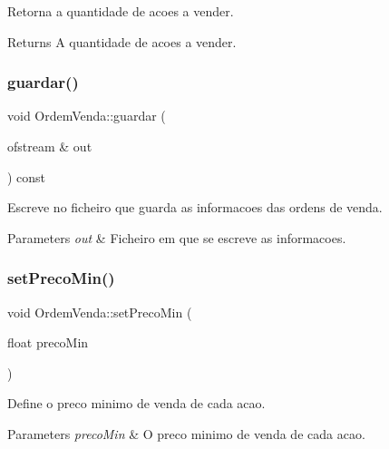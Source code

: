 Retorna a quantidade de acoes a vender. 

\begin{DoxyReturn}{Returns}
A quantidade de acoes a vender. 
\end{DoxyReturn}
\hypertarget{class_ordem_venda_a3d6f78188308caac122209e68287e09f}{}\label{class_ordem_venda_a3d6f78188308caac122209e68287e09f} 
\subsubsection{\texorpdfstring{guardar()}{guardar()}}
{\footnotesize\ttfamily void Ordem\+Venda\+::guardar (\begin{DoxyParamCaption}\item[{ofstream \&}]{out }\end{DoxyParamCaption}) const}



Escreve no ficheiro que guarda as informacoes das ordens de venda. 


\begin{DoxyParams}{Parameters}
{\em out} & Ficheiro em que se escreve as informacoes. \\
\hline
\end{DoxyParams}
\hypertarget{class_ordem_venda_a5b1ae919558cb5cd7bc892e505abf630}{}\label{class_ordem_venda_a5b1ae919558cb5cd7bc892e505abf630} 
\subsubsection{\texorpdfstring{set\+Preco\+Min()}{setPrecoMin()}}
{\footnotesize\ttfamily void Ordem\+Venda\+::set\+Preco\+Min (\begin{DoxyParamCaption}\item[{float}]{preco\+Min }\end{DoxyParamCaption})\hspace{0.3cm}{\ttfamily [inline]}}



Define o preco minimo de venda de cada acao. 


\begin{DoxyParams}{Parameters}
{\em preco\+Min} & O preco minimo de venda de cada acao. \\
\hline
\end{DoxyParams}
\hypertarget{class_ordem_venda_a44040292fc692df291cc909d486031de}{}\label{class_ordem_venda_a44040292fc692df291cc909d486031de} 
